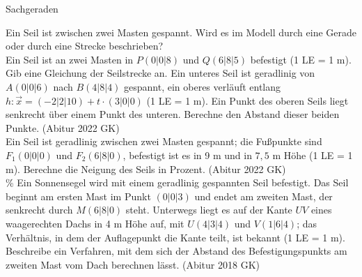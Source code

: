 \setcounter{aufgabe}{17}

\begin{aufgabe}{Sachgeraden}
\begin{teile}
\teil Ein Seil ist zwischen zwei Masten gespannt. Wird es im Modell durch eine Gerade oder durch eine Strecke beschrieben?  \\ 
\teil Ein Seil ist an zwei Masten in $P(0 | 0 | 8)$ und $Q(6 | 8 | 5)$ befestigt (1 LE = 1 m). Gib eine Gleichung der Seilstrecke an.
\teil Ein unteres Seil ist geradlinig von $A(0 | 0 | 6)$ nach $B(4 | 8 | 4)$ gespannt, ein oberes verläuft entlang $h\colon \vec x = (-2 | 2 | 10) + t \cdot (3 | 0 | 0)$ (1 LE = 1 m). Ein Punkt des oberen Seils liegt senkrecht über einem Punkt des unteren. Berechne den Abstand dieser beiden Punkte. \hfill (Abitur 2022 GK) \\ \leerfeld[m]
\teil Ein Seil ist geradlinig zwischen zwei Masten gespannt; die Fußpunkte sind $F_1(0 | 0 | 0)$ und $F_2(6 | 8 | 0)$, befestigt ist es in 9 m und in $7{,}5$ m Höhe (1 LE = 1 m). Berechne die Neigung des Seils in Prozent. \hfill (Abitur 2022 GK) \\ \leerfeld \%
\teil Ein Sonnensegel wird mit einem geradlinig gespannten Seil befestigt. Das Seil beginnt am ersten Mast im Punkt $(0 | 0 | 3)$ und endet am zweiten Mast, der senkrecht durch $M(6 | 8 | 0)$ steht. Unterwegs liegt es auf der Kante $UV$ eines waagerechten Dachs in 4 m Höhe auf, mit $U(4 | 3 | 4)$ und $V(1 | 6 | 4)$; das Verhältnis, in dem der Auflagepunkt die Kante teilt, ist bekannt (1 LE = 1 m). Beschreibe ein Verfahren, mit dem sich der Abstand des Befestigungspunkts am zweiten Mast vom Dach berechnen lässt. \hfill (Abitur 2018 GK)
\end{teile}
\end{aufgabe}

